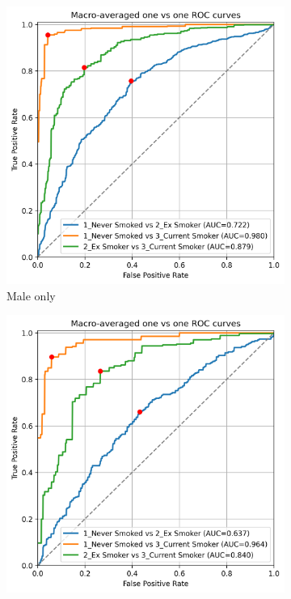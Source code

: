 \documentclass{article} %
\begin{document}
\begin{figure}[!p]
    \centering
    \begin{subfigure}{0.42\linewidth}
        \centering
        \includegraphics[width=\linewidth]{cohort2/male_only/test_macro_ovo_roc.png}
        \caption{Male only}
    \end{subfigure}
    \hspace{4mm}
    \begin{subfigure}{0.42\linewidth}
        \centering
        \includegraphics[width=\linewidth]{cohort2/female_only/test_macro_ovo_roc.png}

\end{subfigure}
\end{figure}
\end{document}
